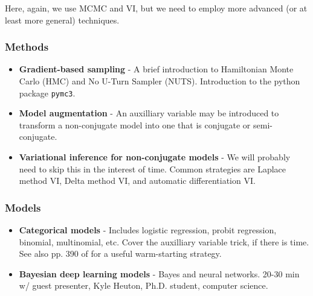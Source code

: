 \documentclass{article} %
\begin{document}
Here, again, we use MCMC and VI, but we need to employ more advanced (or at least more general) techniques.

\subsubsection{Methods}

\begin{itemize}
	\item \textbf{Gradient-based sampling} - A brief introduction to Hamiltonian Monte Carlo (HMC) and No U-Turn Sampler (NUTS).  Introduction to the python package \texttt{pymc3}.
	\item \textbf{Model augmentation} - An auxilliary variable may be introduced to transform a non-conjugate model into one that is conjugate or semi-conjugate.
	\item \textbf{Variational inference for non-conjugate models} - We will probably need to skip this in the interest of time.  Common strategies are Laplace method VI,  Delta method VI, and automatic differentiation VI.
\end{itemize}
\subsubsection{Models}

\begin{itemize}
\item \textbf{Categorical models} - Includes logistic regression, probit regression,  binomial,  multinomial,  etc.  Cover the auxilliary variable trick, if there is time. See also pp.  390 of \cite{hoff2009first} for a useful warm-starting strategy.  
\item \textbf{Bayesian deep learning models} -  Bayes and neural networks.   20-30 min w/ guest presenter,  Kyle Heuton,  Ph.D.  student,  computer science.
\end{itemize}
\end{document}
